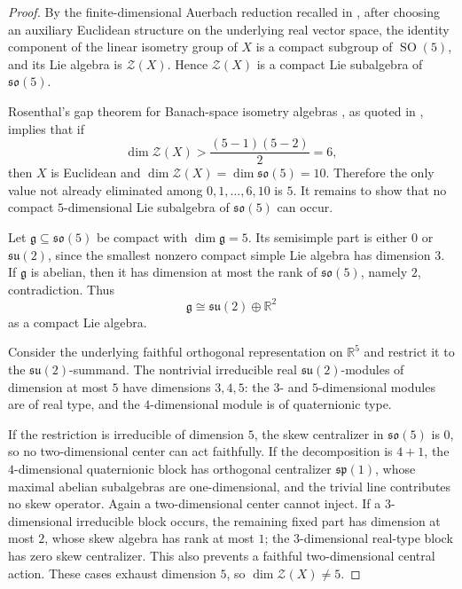\documentclass[11pt]{article}
\theoremstyle{remark}
\newcommand{\R}{\mathbb R}
\newcommand{\fg}{\mathfrak g}
\newcommand{\so}{\mathfrak{so}}
\newcommand{\su}{\mathfrak{su}}
\newcommand{\spalg}{\mathfrak{sp}}
\DeclareMathOperator{\SO}{SO}
\begin{document}
\begin{proof}
By the finite-dimensional Auerbach reduction recalled in \cite{KMP}, after
choosing an auxiliary Euclidean structure on the underlying real vector space,
the identity component of the linear isometry group of \(X\) is a compact
subgroup of \(\SO(5)\), and its Lie algebra is \(\mathcal Z(X)\).  Hence
\(\mathcal Z(X)\) is a compact Lie subalgebra of \(\so(5)\).

Rosenthal's gap theorem for Banach-space isometry algebras
\cite{RosenthalLie}, as quoted in \cite{KMP}, implies that if
\[
 \dim\mathcal Z(X)>\frac{(5-1)(5-2)}2=6,
\]
then \(X\) is Euclidean and \(\dim\mathcal Z(X)=\dim\so(5)=10\).  Therefore
the only value not already eliminated among \(0,1,\ldots,6,10\) is \(5\).
It remains to show that no compact \(5\)-dimensional Lie subalgebra of
\(\so(5)\) can occur.

Let \(\fg\subseteq\so(5)\) be compact with \(\dim\fg=5\).  Its semisimple
part is either \(0\) or \(\su(2)\), since the smallest nonzero compact simple
Lie algebra has dimension \(3\).  If \(\fg\) is abelian, then it has
dimension at most the rank of \(\so(5)\), namely \(2\), contradiction.  Thus
\[
 \fg\cong \su(2)\oplus \R^2
\]
as a compact Lie algebra.

Consider the underlying faithful orthogonal representation on \(\R^5\) and
restrict it to the \(\su(2)\)-summand.  The nontrivial irreducible real
\(\su(2)\)-modules of dimension at most \(5\) have dimensions \(3,4,5\):
the \(3\)- and \(5\)-dimensional modules are of real type, and the
\(4\)-dimensional module is of quaternionic type.

If the restriction is irreducible of dimension \(5\), the skew centralizer
in \(\so(5)\) is \(0\), so no two-dimensional center can act faithfully.  If
the decomposition is \(4+1\), the \(4\)-dimensional quaternionic block has
orthogonal centralizer \(\spalg(1)\), whose maximal abelian subalgebras are
one-dimensional, and the trivial line contributes no skew operator.  Again a
two-dimensional center cannot inject.  If a \(3\)-dimensional irreducible
block occurs, the remaining fixed part has dimension at most \(2\), whose
skew algebra has rank at most \(1\); the \(3\)-dimensional real-type block
has zero skew centralizer.  This also prevents a faithful two-dimensional
central action.  These cases exhaust dimension \(5\), so
\(\dim\mathcal Z(X)\neq5\).


\end{proof}
\end{document}

